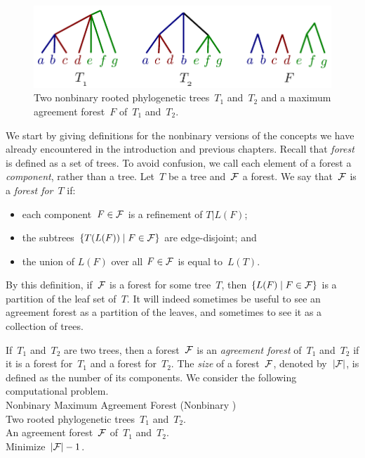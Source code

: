\begin{figure}
    \centering
    \includegraphics[scale=.8]{../figs/fig_maf2}
    \caption{Two nonbinary rooted phylogenetic trees~$T_1$ and~$T_2$ and a maximum agreement forest~$F$ of~$T_1$ and~$T_2$.\label{fig:maf}}
\end{figure}

We start by giving definitions for the nonbinary versions of the concepts we have already encountered in the introduction and previous chapters. Recall that \emph{forest} is defined as a set of trees. To avoid confusion, we call each element of a forest a \emph{component}, rather than a tree. Let~$T$ be a tree and~${\mathcal F}$ a forest. We say that~${\mathcal F}$ is a \emph{forest for}~$T$ if:
\begin{itemize}
\item each component~$F\in{\mathcal F}$ is a refinement of $T|L(F)$;
\item the subtrees $\{T(L(F))\mid F\in {\mathcal F}\}$ are edge-disjoint; and
\item the union of $L(F)$ over all $F\in {\mathcal F}$ is equal to~$L(T)$.
\end{itemize}

By this definition, if~${\mathcal F}$ is a forest for some tree~$T$, then $\{L(F)\mid F\in{\mathcal F}\}$ is a partition of the leaf set of~$T$. It will indeed sometimes be useful to see an agreement forest as a partition of the leaves, and sometimes to see it as a collection of trees.

If~$T_1$ and~$T_2$ are two trees, then a forest~${\mathcal F}$ is an \emph{agreement forest} of~$T_1$ and~$T_2$ if it is a forest for~$T_1$ and a forest for~$T_2$. The \emph{size} of a forest~${\mathcal F}$, denoted by~$|{\mathcal F}|$, is defined as the number of its components. We consider the following computational problem. \\

 {\sc Nonbinary Maximum Agreement Forest} (Nonbinary \maf)\\
 Two rooted phylogenetic trees~$T_1$ and~$T_2$. \\
 An agreement forest~${\mathcal F}$ of~$T_1$ and~$T_2$.\\
 Minimize~$|{\mathcal F}|-1$.\\

